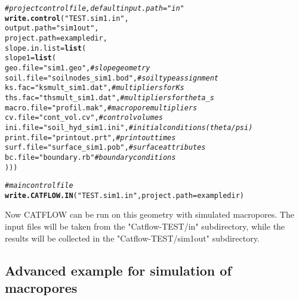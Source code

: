 \documentclass[article,nojss]{jss}\usepackage[]{graphicx}\usepackage[]{xcolor}
\makeatletter
\newcommand{\hlsng}[1]{\textcolor[rgb]{0.192,0.494,0.8}{#1}}%
\newcommand{\hlcom}[1]{\textcolor[rgb]{0.678,0.584,0.686}{\textit{#1}}}%
\newcommand{\hldef}[1]{\textcolor[rgb]{0.345,0.345,0.345}{#1}}%
\newcommand{\hlkwc}[1]{\textcolor[rgb]{0.333,0.667,0.333}{#1}}%
\newcommand{\hlkwd}[1]{\textcolor[rgb]{0.737,0.353,0.396}{\textbf{#1}}}%
\newenvironment{kframe}{%
 \def\at@end@of@kframe{}%
 \ifinner\ifhmode%
  \def\at@end@of@kframe{\end{minipage}}%
  \begin{minipage}{\columnwidth}%
 \fi\fi%
 \def\FrameCommand##1{\hskip\@totalleftmargin \hskip-\fboxsep
 \colorbox{shadecolor}{##1}\hskip-\fboxsep
     \hskip-\linewidth \hskip-\@totalleftmargin \hskip\columnwidth}%
 \MakeFramed {\advance\hsize-\width
   \@totalleftmargin\z@ \linewidth\hsize
   \@setminipage}}%
 {\par\unskip\endMakeFramed%
 \at@end@of@kframe}
\newenvironment{knitrout}{}{} %
\makeatother
\begin{document}
\begin{knitrout}
\color{fgcolor}\begin{kframe}
\begin{alltt}
\hlcom{# project control file,  default input.path="in"    }
\hlkwd{write.control}\hldef{(}\hlsng{"TEST.sim1.in"}\hldef{,}
  \hlkwc{output.path}\hldef{=} \hlsng{"sim1out"}\hldef{,}
  \hlkwc{project.path} \hldef{= exampledir,}
  \hlkwc{slope.in.list} \hldef{=} \hlkwd{list}\hldef{(}
    \hlkwc{slope1} \hldef{=} \hlkwd{list}\hldef{(}
      \hlkwc{geo.file}\hldef{=} \hlsng{"sim1.geo"}            \hldef{,}  \hlcom{# slope geometry     }
      \hlkwc{soil.file}\hldef{=} \hlsng{"soilnodes_sim1.bod"} \hldef{,}  \hlcom{# soil type assignment}
      \hlkwc{ks.fac} \hldef{=} \hlsng{"ksmult_sim1.dat"}      \hldef{,}  \hlcom{# multipliers for Ks}
      \hlkwc{ths.fac} \hldef{=} \hlsng{"thsmult_sim1.dat"}    \hldef{,}  \hlcom{# multipliers for theta_s }
      \hlkwc{macro.file} \hldef{=} \hlsng{"profil.mak"}    \hldef{,}     \hlcom{# macropore multipliers}
      \hlkwc{cv.file} \hldef{=} \hlsng{"cont_vol.cv"}      \hldef{,}     \hlcom{# control volumes}
      \hlkwc{ini.file} \hldef{=} \hlsng{"soil_hyd_sim1.ini"}\hldef{,}    \hlcom{# initial conditions (theta/psi)}
      \hlkwc{print.file} \hldef{=} \hlsng{"printout.prt"}  \hldef{,}     \hlcom{# printout times}
      \hlkwc{surf.file} \hldef{=} \hlsng{"surface_sim1.pob"}\hldef{,}    \hlcom{# surface attributes}
      \hlkwc{bc.file} \hldef{=} \hlsng{"boundary.rb"}            \hlcom{# boundary conditions}
      \hldef{)))}

 \hlcom{# main control file}
 \hlkwd{write.CATFLOW.IN}\hldef{(}\hlsng{"TEST.sim1.in"}\hldef{,} \hlkwc{project.path} \hldef{= exampledir)}
\end{alltt}
\end{kframe}
\end{knitrout}

Now CATFLOW can be run on this geometry with simulated macropores. The input files will be 
taken from the "Catflow-TEST/in" subdirectory, while the results will be collected in the "Catflow-TEST/sim1out" 
subdirectory.


\clearpage
                                                                 
\subsection{Advanced example for simulation of macropores}
\end{document}
